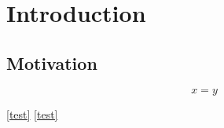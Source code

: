 \chapter{Introduction}
\section{Motivation}

\begin{equation}
    x=y
    \label{test}
\end{equation}

\lipsum[10]
\ref{test}
\lipsum[10]
\autoref{test}
